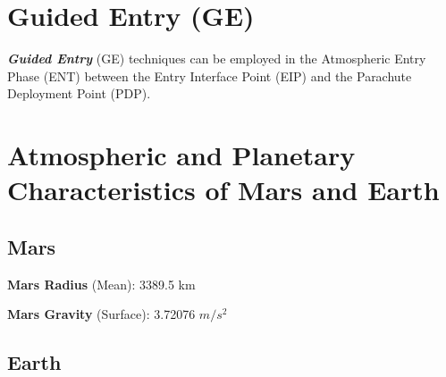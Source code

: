 
\section{Guided Entry (GE)}

    \textbf{\textit{Guided Entry}} (GE) techniques can be employed in the Atmospheric Entry Phase (ENT)
    between the Entry Interface Point (EIP) and the Parachute Deployment Point (PDP).

\section{Atmospheric and Planetary Characteristics of Mars and Earth}

    \subsection{Mars}

        \textbf{Mars Radius} (Mean): 3389.5 km

        \textbf{Mars Gravity} (Surface): 3.72076 $m/s^2$


    \subsection{Earth}

